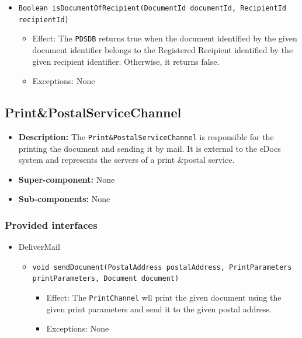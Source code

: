 \documentclass[a4paper,10pt]{article}
\begin{document}
\begin{itemize}
\begin{itemize}
		\item \texttt{Boolean isDocumentOfRecipient(DocumentId documentId, RecipientId recipientId)}
        \begin{itemize}
            \item Effect: The \texttt{PDSDB} returns true when the document identified by the given document identifier belongs to the Registered Recipient identified by the given recipient identifier. Otherwise, it returns false.
            \item Exceptions: None
		\end{itemize}         
         
    \end{itemize}
\end{itemize}

\subsection{Print\&PostalServiceChannel}
\begin{itemize}
    \item \textbf{Description:}  The \texttt{Print\&PostalServiceChannel} is responsible for the printing the document and sending it by mail. It is external to the eDocs system and represents the servers of a print \&postal service.
    \item \textbf{Super-component:} None
    \item \textbf{Sub-components:} None
\end{itemize}

\subsubsection*{Provided interfaces}
\begin{itemize}
    \item DeliverMail
    \begin{itemize}
        \item \texttt{void sendDocument(PostalAddress postalAddress, PrintParameters printParameters, Document document)}
        \begin{itemize}
            \item Effect: The \texttt{PrintChannel} wll print the given document using the given print parameters and send it to the given postal address.
            \item Exceptions: None
		\end{itemize}
    \end{itemize}
\end{itemize}
\end{document}
